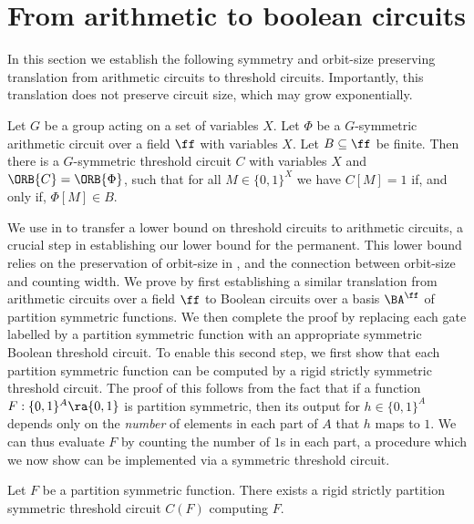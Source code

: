 \documentclass{toc}
\begin{document}
\section{From arithmetic to boolean circuits}\label{sec:formulas-to-circuits}
In this section we establish the following symmetry and orbit-size preserving translation from
arithmetic circuits to threshold circuits. Importantly, this translation does not preserve circuit size, which may grow exponentially.
\begin{theorem}
  Let $G$ be a group acting on a set of variables $X$. Let $\Phi$ be a
  $G$-symmetric arithmetic circuit over a field $\ff$ with variables $X$. Let $B
  \subseteq \ff$ be finite. Then there is a $G$-symmetric threshold circuit $C$
  with variables $X$ and $\ORB{C} = \ORB{\Phi}$, such that for all $M \in \{0, 1\}^X$ we have $C[M] = 1$
  if, and only if, $\Phi[M] \in B$.
  \label{thm:arithmetic-to-boolean}
\end{theorem}
We use  in  to
transfer a lower bound on threshold circuits to arithmetic circuits, a crucial
step in establishing our lower bound for the permanent. This lower bound relies on the preservation of orbit-size in , and the connection between orbit-size and counting width.
We prove  by first establishing a similar
translation from arithmetic circuits over a field $\ff$ to Boolean circuits over
a basis $\BA^{\ff}$ 
of partition symmetric functions. We then complete the proof
by replacing each gate labelled by a partition symmetric function with an
appropriate symmetric Boolean threshold circuit.
To enable this second step, we first show that each partition symmetric function
can be computed by a rigid strictly symmetric threshold circuit. The proof of
this follows from the fact that if a function $F: \{0, 1\}^A \ra \{0, 1\}$ is
partition symmetric, then its output for $h \in \{0, 1\}^A$ depends only on the
\emph{number} of elements in each part of $A$ that $h$ maps to $1$. We can thus
evaluate $F$ by counting the number of $1$s in each part, a procedure which we
now show can be implemented via a symmetric threshold circuit.
\begin{lemma}
  Let $F$ be a partition symmetric function. There exists a rigid strictly
  partition symmetric threshold circuit $C(F)$ computing $F$.
  \label{lem:partition-symmetric}
\end{lemma}
\end{document}
